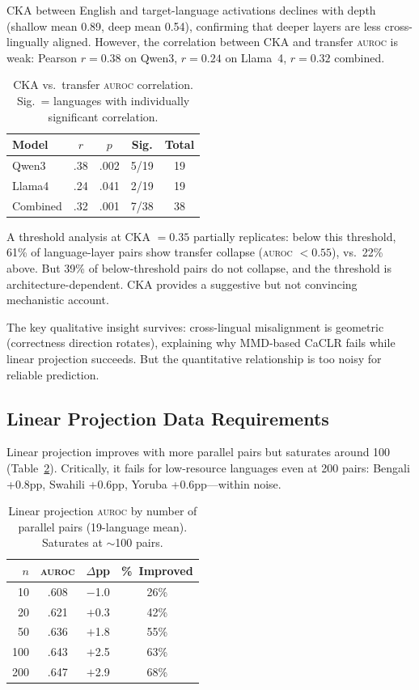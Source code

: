 \documentclass[11pt,a4paper]{article}
\newcommand{\auroc}{\textsc{auroc}}
\begin{document}
CKA between English and target-language activations declines with depth (shallow mean 0.89, deep mean 0.54), confirming that deeper layers are less cross-lingually aligned. However, the correlation between CKA and transfer \auroc{} is weak: Pearson $r = 0.38$ on Qwen3, $r = 0.24$ on Llama~4, $r = 0.32$ combined.

\begin{table}[t]
\centering
\small
\begin{tabular}{@{}lcccc@{}}
\toprule
\textbf{Model} & \textbf{$r$} & \textbf{$p$} & \textbf{Sig.} & \textbf{Total} \\
\midrule
Qwen3 & .38 & .002 & 5/19 & 19 \\
Llama4 & .24 & .041 & 2/19 & 19 \\
Combined & .32 & .001 & 7/38 & 38 \\
\bottomrule
\end{tabular}
\caption{CKA vs.\ transfer \auroc{} correlation. Sig.\ = languages with individually significant correlation.}
\label{tab:cka}
\end{table}

A threshold analysis at CKA $= 0.35$ partially replicates: below this threshold, 61\% of language-layer pairs show transfer collapse (\auroc{} $< 0.55$), vs.\ 22\% above. But 39\% of below-threshold pairs do not collapse, and the threshold is architecture-dependent. CKA provides a suggestive but not convincing mechanistic account.

The key qualitative insight survives: cross-lingual misalignment is geometric (correctness direction rotates), explaining why MMD-based CaCLR fails while linear projection succeeds. But the quantitative relationship is too noisy for reliable prediction.

\subsection{Linear Projection Data Requirements}
\label{sec:linproj}

Linear projection improves with more parallel pairs but saturates around 100 (Table~\ref{tab:linproj_pairs}). Critically, it fails for low-resource languages even at 200 pairs: Bengali +0.8pp, Swahili +0.6pp, Yoruba +0.6pp---within noise.

\begin{table}[t]
\centering
\small
\begin{tabular}{@{}rccc@{}}
\toprule
\textbf{$n$} & \textbf{\auroc{}} & \textbf{$\Delta$pp} & \textbf{\%~Improved} \\
\midrule
10 & .608 & $-$1.0 & 26\% \\
20 & .621 & $+$0.3 & 42\% \\
50 & .636 & $+$1.8 & 55\% \\
100 & .643 & $+$2.5 & 63\% \\
200 & .647 & $+$2.9 & 68\% \\
\bottomrule
\end{tabular}
\caption{Linear projection \auroc{} by number of parallel pairs (19-language mean). Saturates at $\sim$100 pairs.}
\label{tab:linproj_pairs}
\end{table}
\end{document}
